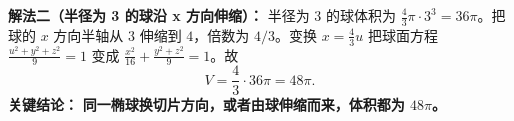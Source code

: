 \begin{examplebox}
\textbf{\textcolor{CExample}{解法二（半径为 3 的球沿 x 方向伸缩）：}}
半径为 \(3\) 的球体积为 \(\frac43\pi\cdot3^{3}=36\pi\)。把球的 \(x\) 方向半轴从 \(3\) 伸缩到 \(4\)，倍数为 \(4/3\)。变换 \(x=\frac43u\) 把球面方程 \(\frac{u^{2}+y^{2}+z^{2}}{9}=1\) 变成 \(\frac{x^{2}}{16}+\frac{y^{2}+z^{2}}{9}=1\)。故
\[
V=\frac43\cdot36\pi=\boxed{48\pi}.
\]
\textbf{\textcolor{CExample}{关键结论：}} \textbf{同一椭球换切片方向，或者由球伸缩而来，体积都为 \(48\pi\)。}

\end{examplebox}
